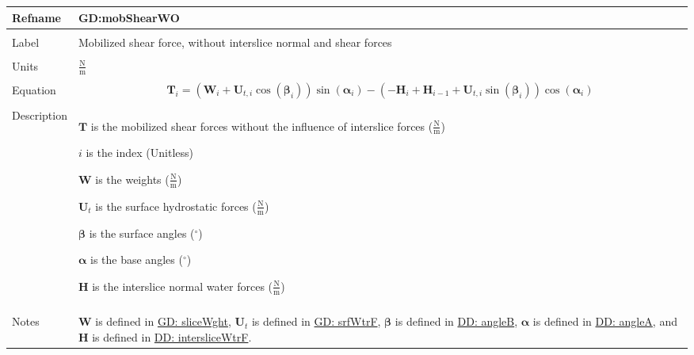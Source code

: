 \documentclass[12pt]{article}
\begin{document}
\noindent \begin{minipage}{\textwidth}
          \begin{tabular}{>{\raggedright}p{}>{\raggedright\arraybackslash}p{}}
          \toprule \textbf{Refname} & \textbf{GD:mobShearWO}
          \label{GD:mobShearWO}
          \\ \midrule \\
          Label & Mobilized shear force, without interslice normal and shear forces
          \\ \midrule \\
          Units & $\frac{\text{N}}{\text{m}}$
          \\ \midrule \\
          Equation & \begin{displaymath}
                     {\mathbf{T}}_{i}=\left({\mathbf{W}}_{i}+{\mathbf{U}_{t,i}} \cos\left({\mathbf{β}}_{i}\right)\right) \sin\left({\mathbf{α}}_{i}\right)-\left(-{\mathbf{H}}_{i}+{\mathbf{H}}_{i-1}+{\mathbf{U}_{t,i}} \sin\left({\mathbf{β}}_{i}\right)\right) \cos\left({\mathbf{α}}_{i}\right)
                     \end{displaymath}
          \\ \midrule \\
          Description & \begin{symbDescription}
                        \item{$\mathbf{T}$ is the mobilized shear forces without the influence of interslice forces ($\frac{\text{N}}{\text{m}}$)}
                        \item{$i$ is the index (Unitless)}
                        \item{$\mathbf{W}$ is the weights ($\frac{\text{N}}{\text{m}}$)}
                        \item{${\mathbf{U}_{t}}$ is the surface hydrostatic forces ($\frac{\text{N}}{\text{m}}$)}
                        \item{$\mathbf{β}$ is the surface angles (${}^{\circ}$)}
                        \item{$\mathbf{α}$ is the base angles (${}^{\circ}$)}
                        \item{$\mathbf{H}$ is the interslice normal water forces ($\frac{\text{N}}{\text{m}}$)}
                        \end{symbDescription}
          \\ \midrule \\
          Notes & $\mathbf{W}$ is defined in \hyperref[GD:sliceWght]{GD: sliceWght}, ${\mathbf{U}_{t}}$ is defined in \hyperref[GD:srfWtrF]{GD: srfWtrF}, $\mathbf{β}$ is defined in \hyperref[DD:angleB]{DD: angleB}, $\mathbf{α}$ is defined in \hyperref[DD:angleA]{DD: angleA}, and $\mathbf{H}$ is defined in \hyperref[DD:intersliceWtrF]{DD: intersliceWtrF}.

\end{tabular}
\end{minipage}
\end{document}
